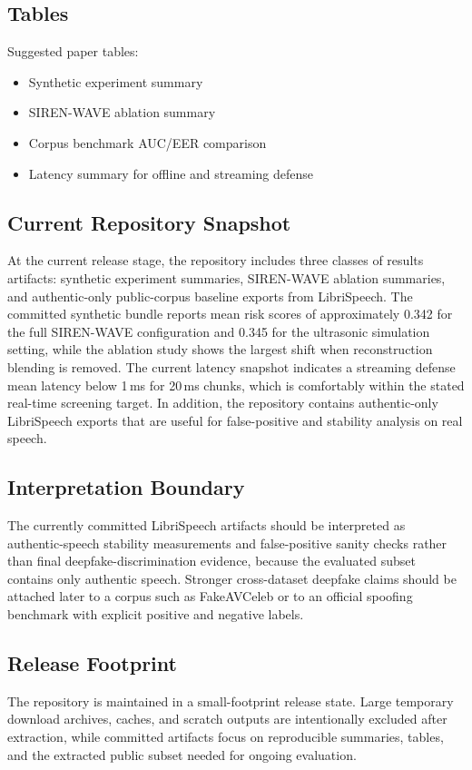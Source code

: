 \documentclass[conference]{IEEEtran}
\begin{document}
\subsection{Tables}
Suggested paper tables:
\begin{itemize}
\item Synthetic experiment summary
\item SIREN-WAVE ablation summary
\item Corpus benchmark AUC/EER comparison
\item Latency summary for offline and streaming defense
\end{itemize}

\subsection{Current Repository Snapshot}
At the current release stage, the repository includes three classes of results artifacts: synthetic experiment summaries, SIREN-WAVE ablation summaries, and authentic-only public-corpus baseline exports from LibriSpeech. The committed synthetic bundle reports mean risk scores of approximately 0.342 for the full SIREN-WAVE configuration and 0.345 for the ultrasonic simulation setting, while the ablation study shows the largest shift when reconstruction blending is removed. The current latency snapshot indicates a streaming defense mean latency below 1\,ms for 20\,ms chunks, which is comfortably within the stated real-time screening target. In addition, the repository contains authentic-only LibriSpeech exports that are useful for false-positive and stability analysis on real speech.

\subsection{Interpretation Boundary}
The currently committed LibriSpeech artifacts should be interpreted as authentic-speech stability measurements and false-positive sanity checks rather than final deepfake-discrimination evidence, because the evaluated subset contains only authentic speech. Stronger cross-dataset deepfake claims should be attached later to a corpus such as FakeAVCeleb or to an official spoofing benchmark with explicit positive and negative labels.

\subsection{Release Footprint}
The repository is maintained in a small-footprint release state. Large temporary download archives, caches, and scratch outputs are intentionally excluded after extraction, while committed artifacts focus on reproducible summaries, tables, and the extracted public subset needed for ongoing evaluation.
\end{document}
